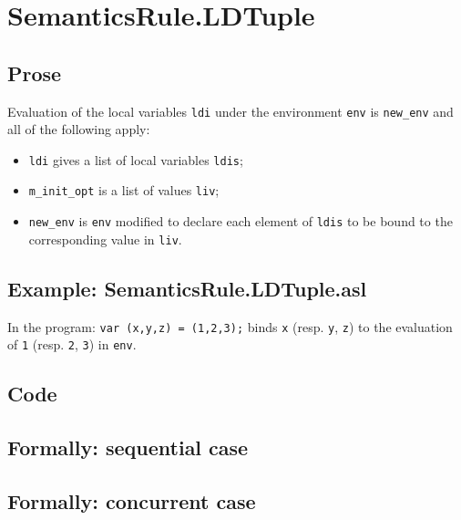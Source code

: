 \documentclass{book}
\begin{document}

\section{SemanticsRule.LDTuple \label{sec:SemanticsRule.LDTuple}}

    \subsection{Prose}
Evaluation of the local variables \texttt{ldi} under the environment
\texttt{env} is \texttt{new\_env} and all of the following apply:
    \begin{itemize}
    \item \texttt{ldi} gives a list of local variables \texttt{ldis};
    \item \texttt{m\_init\_opt} is a list of values \texttt{liv};
    \item \texttt{new\_env} is \texttt{env} modified to declare each element of \texttt{ldis} to be bound
      to the corresponding value in \texttt{liv}.
    \end{itemize}

    \subsection{Example: SemanticsRule.LDTuple.asl}
    In the program:
    \texttt{var (x,y,z) = (1,2,3);} binds \texttt{x} (resp. \texttt{y}, \texttt{z}) to the evaluation of
    \texttt{1} (resp. \texttt{2}, \texttt{3}) in \texttt{env}.

  \subsection{Code}

\begin{emptyformal}
  \subsection{Formally: sequential case}

  \subsection{Formally: concurrent case}
\end{emptyformal}
\end{document}
